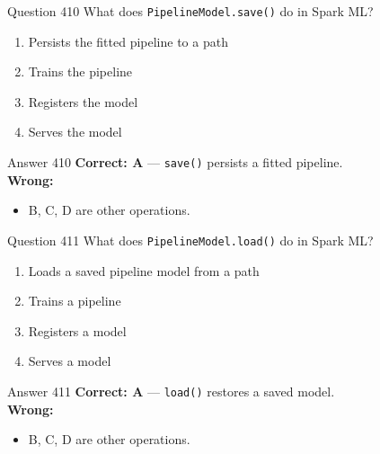 \documentclass[aspectratio=169,11pt]{beamer}
\begin{document}
	\begin{frame}{Question 410}
		What does \texttt{PipelineModel.save()} do in Spark ML?
		\begin{enumerate}[label=\Alph*.]
			\item Persists the fitted pipeline to a path
			\item Trains the pipeline
			\item Registers the model
			\item Serves the model
		\end{enumerate}
	\end{frame}
	\begin{frame}{Answer 410}
		\textbf{Correct: A} --- \texttt{save()} persists a fitted pipeline.\\
		\vspace{0.5em}
		\textbf{Wrong:}
		\begin{itemize}
			\item B, C, D are other operations.
		\end{itemize}
	\end{frame}
	
	\begin{frame}{Question 411}
		What does \texttt{PipelineModel.load()} do in Spark ML?
		\begin{enumerate}[label=\Alph*.]
			\item Loads a saved pipeline model from a path
			\item Trains a pipeline
			\item Registers a model
			\item Serves a model
		\end{enumerate}
	\end{frame}
	\begin{frame}{Answer 411}
		\textbf{Correct: A} --- \texttt{load()} restores a saved model.\\
		\vspace{0.5em}
		\textbf{Wrong:}
		\begin{itemize}
			\item B, C, D are other operations.
		\end{itemize}
	\end{frame}
	
\end{document}
